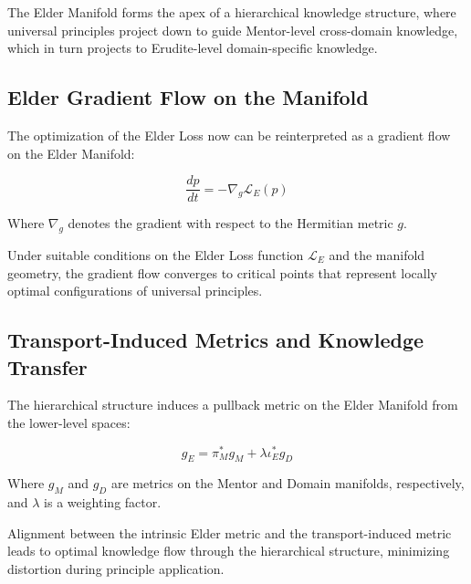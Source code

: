 \begin{theorem}
The Elder Manifold forms the apex of a hierarchical knowledge structure, where universal principles project down to guide Mentor-level cross-domain knowledge, which in turn projects to Erudite-level domain-specific knowledge.
\end{theorem}

\subsection{Elder Gradient Flow on the Manifold}

The optimization of the Elder Loss now can be reinterpreted as a gradient flow on the Elder Manifold:

\begin{equation}
\frac{dp}{dt} = -\nabla_g \mathcal{L}_E(p)
\end{equation}

Where $\nabla_g$ denotes the gradient with respect to the Hermitian metric $g$.

\begin{proposition}
Under suitable conditions on the Elder Loss function $\mathcal{L}_E$ and the manifold geometry, the gradient flow converges to critical points that represent locally optimal configurations of universal principles.
\end{proposition}

\subsection{Transport-Induced Metrics and Knowledge Transfer}

The hierarchical structure induces a pullback metric on the Elder Manifold from the lower-level spaces:

\begin{equation}
g_E = \pi_M^* g_M + \lambda \iota_E^* g_D
\end{equation}

Where $g_M$ and $g_D$ are metrics on the Mentor and Domain manifolds, respectively, and $\lambda$ is a weighting factor.

\begin{theorem}
Alignment between the intrinsic Elder metric and the transport-induced metric leads to optimal knowledge flow through the hierarchical structure, minimizing distortion during principle application.
\end{theorem}

